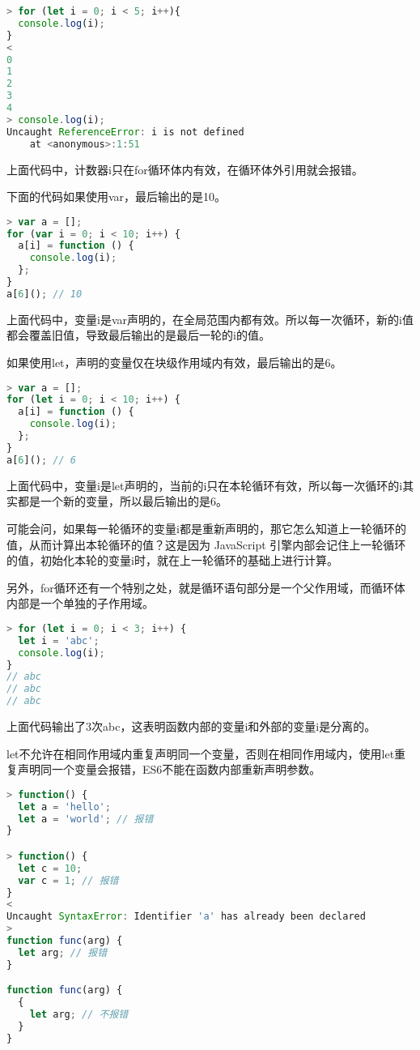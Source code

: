 \begin{lstlisting}[language=JavaScript]
> for (let i = 0; i < 5; i++){
  console.log(i);
}
< 
0
1
2
3
4
> console.log(i);
Uncaught ReferenceError: i is not defined
    at <anonymous>:1:51
\end{lstlisting}

上面代码中，计数器i只在for循环体内有效，在循环体外引用就会报错。

下面的代码如果使用var，最后输出的是10。

\begin{lstlisting}[language=JavaScript]
> var a = [];
for (var i = 0; i < 10; i++) {
  a[i] = function () {
    console.log(i);
  };
}
a[6](); // 10
\end{lstlisting}

上面代码中，变量i是var声明的，在全局范围内都有效。所以每一次循环，新的i值都会覆盖旧值，导致最后输出的是最后一轮的i的值。

如果使用let，声明的变量仅在块级作用域内有效，最后输出的是6。

\begin{lstlisting}[language=JavaScript]
> var a = [];
for (let i = 0; i < 10; i++) {
  a[i] = function () {
    console.log(i);
  };
}
a[6](); // 6
\end{lstlisting}

上面代码中，变量i是let声明的，当前的i只在本轮循环有效，所以每一次循环的i其实都是一个新的变量，所以最后输出的是6。

可能会问，如果每一轮循环的变量i都是重新声明的，那它怎么知道上一轮循环的值，从而计算出本轮循环的值？这是因为 JavaScript 引擎内部会记住上一轮循环的值，初始化本轮的变量i时，就在上一轮循环的基础上进行计算。

另外，for循环还有一个特别之处，就是循环语句部分是一个父作用域，而循环体内部是一个单独的子作用域。

\begin{lstlisting}[language=JavaScript]
> for (let i = 0; i < 3; i++) {
  let i = 'abc';
  console.log(i);
}
// abc
// abc
// abc
\end{lstlisting}

上面代码输出了3次abc，这表明函数内部的变量i和外部的变量i是分离的。

let不允许在相同作用域内重复声明同一个变量，否则在相同作用域内，使用let重复声明同一个变量会报错，ES6不能在函数内部重新声明参数。


\begin{lstlisting}[language=JavaScript]
> function() {
  let a = 'hello';
  let a = 'world'; // 报错
}

> function() {
  let c = 10;
  var c = 1; // 报错
}
< 
Uncaught SyntaxError: Identifier 'a' has already been declared
>
function func(arg) {
  let arg; // 报错
}

function func(arg) {
  {
    let arg; // 不报错
  }
}
\end{lstlisting}

